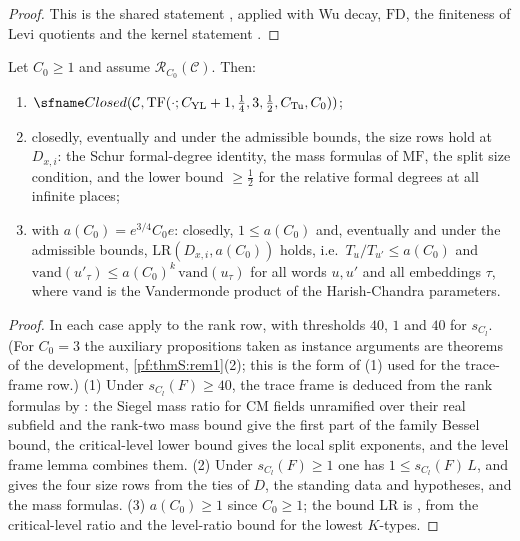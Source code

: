 \begin{proof}
This is the shared statement , applied with Wu decay,
$\mathrm{FD}$, the finiteness of Levi quotients  and
the kernel statement .
\end{proof}

\begin{lemma}\label{pf:thmS:tf}
Let $C_0\ge1$ and assume $\mathcal{R}_{C_0}(\mathcal C)$. Then:
\begin{enumerate}
\item $\thmSClosed(\mathcal C,\mathrm{TF}(\cdot;C_{\mathrm{YL}}+1,\tfrac14,3,\tfrac12,C_{\mathrm{Tu}},C_0))$;
\item closedly, eventually and under the admissible bounds, the size rows hold at $D_{x,i}$: the
Schur formal-degree identity, the mass formulas of $\mathrm{MF}$, the split size condition, and
the lower bound $\ge\frac12$ for the relative formal degrees at all infinite places;
\item with $a(C_0)=e^{3/4}C_0e$: closedly, $1\le a(C_0)$ and, eventually and under the admissible bounds,
$\mathrm{LR}(D_{x,i},a(C_0))$ holds, i.e.\ $T_u/T_{u'}\le a(C_0)$ and
$\mathrm{vand}(u'_\tau)\le a(C_0)^k\,\mathrm{vand}(u_\tau)$ for all words $u,u'$ and all embeddings $\tau$, where
$\mathrm{vand}$ is the Vandermonde product of the Harish-Chandra parameters.
\end{enumerate}
\end{lemma}

\begin{proof}
In each case apply  to the rank row, with thresholds $40$, $1$ and $40$
for $s_{C_l}$. (For $C_0=3$ the auxiliary propositions taken as instance arguments are theorems of the development,
\cref{pf:thmS:rem1}(2); this is the form of (1) used for the trace-frame row.) (1) Under $s_{C_l}(F)\ge40$, the trace frame is deduced from the rank formulas by
: the Siegel mass ratio for CM fields unramified over their
real subfield and the rank-two mass bound give the first part of the family Bessel bound, the critical-level lower
bound gives the local split exponents, and the level frame lemma combines them. (2) Under $s_{C_l}(F)\ge1$ one has
$1\le s_{C_l}(F)\,L$, and  gives the four size rows from the
ties of $D$, the standing data and hypotheses, and the mass formulas. (3) $a(C_0)\ge1$ since $C_0\ge1$; the bound
$\mathrm{LR}$ is , from the critical-level ratio and the
level-ratio bound for the lowest $K$-types.
\end{proof}

